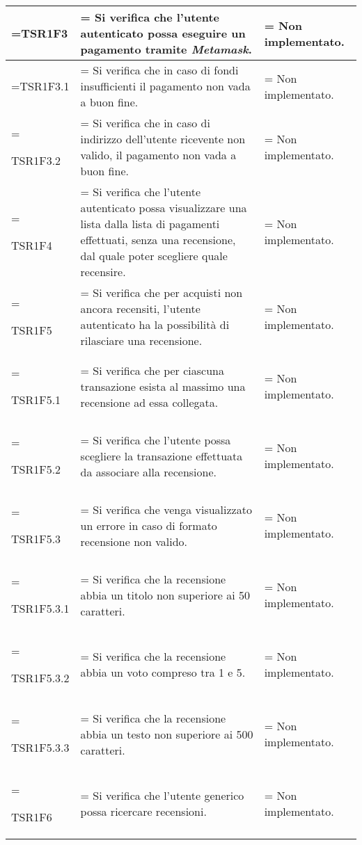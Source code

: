 \begin{xltabular}{\textwidth} {
        >{\hsize\linewidth=\hsize}X
        >{\hsize\linewidth=\hsize}X
        >{\hsize\linewidth=\hsize}X
    }
    TSR1F3&
    Si verifica che l'utente autenticato possa eseguire un pagamento tramite \textit{Metamask}. &
    Non implementato.
    \\ \hline
    
    TSR1F3.1&
    Si verifica che in caso di fondi insufficienti il pagamento non vada a buon fine.&
    Non implementato.
    \\ \hline
    
    TSR1F3.2&
    Si verifica che in caso di indirizzo dell'utente ricevente non valido, il pagamento non vada a buon fine.&
    Non implementato.
    \\ \hline
    
    TSR1F4&
    Si verifica che l'utente autenticato possa visualizzare una lista dalla lista di pagamenti effettuati, senza una recensione, dal quale poter scegliere quale recensire.&
    Non implementato.
    \\ \hline

    TSR1F5&
    Si verifica che per acquisti non ancora recensiti, l'utente autenticato ha la possibilità di rilasciare una recensione.&
    Non implementato.
    \\ \hline

    TSR1F5.1&
    Si verifica che per ciascuna transazione esista al massimo una recensione ad essa collegata.&
    Non implementato.
    \\ \hline
    
    TSR1F5.2&
    Si verifica che l'utente possa scegliere la transazione effettuata da associare alla recensione.&
    Non implementato.
    \\ \hline

    TSR1F5.3&
    Si verifica che venga visualizzato un errore in caso di formato recensione non valido.&
    Non implementato.
    \\ \hline
    
    TSR1F5.3.1&
    Si verifica che la recensione abbia un titolo non superiore ai 50 caratteri.&
    Non implementato.
    \\ \hline

    TSR1F5.3.2&
    Si verifica che la recensione abbia un voto compreso tra 1 e 5.&
    Non implementato.
    \\ \hline

    TSR1F5.3.3&
    Si verifica che la recensione abbia un testo non superiore ai 500 caratteri.&
    Non implementato.
    \\ \hline

    TSR1F6&
    Si verifica che l'utente generico possa ricercare recensioni.&
    Non implementato.
    \\ \hline


\end{xltabular}
